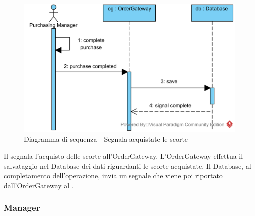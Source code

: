 \begin{figure}[H]
	\centering
	\includegraphics[width=14cm]{../../documenti/SpecificaTecnica/diagrammi_img/sequenza/responsabile_acquisti_segnala_scorte_acquistate.png}
	\caption{Diagramma di sequenza - Segnala acquistate le scorte}
\end{figure}
Il \Purchasingmanager{} segnala l'acquisto delle scorte all'Order\-Gateway. L'Order\-Gateway effettua il salvataggio nel Database dei dati riguardanti le scorte acquistate. Il Database, al completamento dell'operazione, invia un segnale che viene poi riportato dall'Order\-Gateway al \Purchasingmanager{}.

\subsubsection{Manager}

